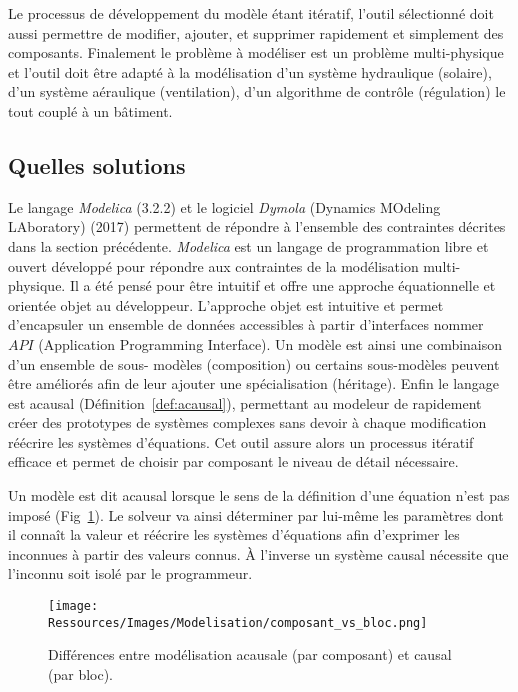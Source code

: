 Le processus de développement du modèle étant itératif, l’outil sélectionné
doit aussi permettre de modifier, ajouter, et supprimer rapidement et simplement des composants.
Finalement le problème à modéliser est un problème multi-physique et l’outil doit être
adapté à la modélisation d’un système hydraulique (solaire), d’un système aéraulique
(ventilation), d’un algorithme de contrôle (régulation) le tout couplé à un bâtiment.



\subsection{Quelles solutions} %
\label{sub:quelles_solutions}
Le langage \emph{Modelica} (3.2.2) et le logiciel \emph{Dymola} (Dynamics MOdeling LAboratory) (2017)
permettent de répondre à l’ensemble des contraintes décrites dans la section précédente.
\emph{Modelica} est un langage de programmation libre et ouvert développé pour répondre
aux contraintes de la modélisation multi-physique. Il a été pensé pour être intuitif et
offre une approche équationnelle et orientée objet au développeur. L’approche objet est
intuitive et permet d’encapsuler un ensemble de données accessibles à partir d’interfaces
nommer $API$ (Application Programming Interface). Un modèle est ainsi une combinaison d’un ensemble de sous-
modèles (composition) ou certains sous-modèles peuvent être améliorés afin de leur ajouter
une spécialisation (héritage). Enfin le langage est acausal
(Définition~\ref{def:acausal}), permettant au modeleur de rapidement créer des
prototypes de systèmes complexes sans devoir à chaque modification réécrire les systèmes
d’équations. Cet outil assure alors un processus itératif efficace et permet de
choisir par composant le niveau de détail nécessaire.


\begin{Def}[Acausal]\label{def:acausal}
Un modèle est dit acausal lorsque le sens de la définition d’une équation n’est pas
imposé (Fig~\ref{fig:acausal_vs_causal}). Le solveur va ainsi déterminer par lui-même les
paramètres dont il connaît la valeur et réécrire les systèmes d’équations afin d’exprimer
les inconnues à partir des valeurs connus. À l’inverse un système causal nécessite
que l’inconnu soit isolé par le programmeur.
\end{Def}

\begin{figure}
    \begin{center}
        \texttt{[image: Ressources/Images/Modelisation/composant\_vs\_bloc.png]}
    \end{center}
    \caption{Différences entre modélisation acausale (par composant) et causal (par bloc).
             \label{fig:acausal_vs_causal}}
\end{figure}

